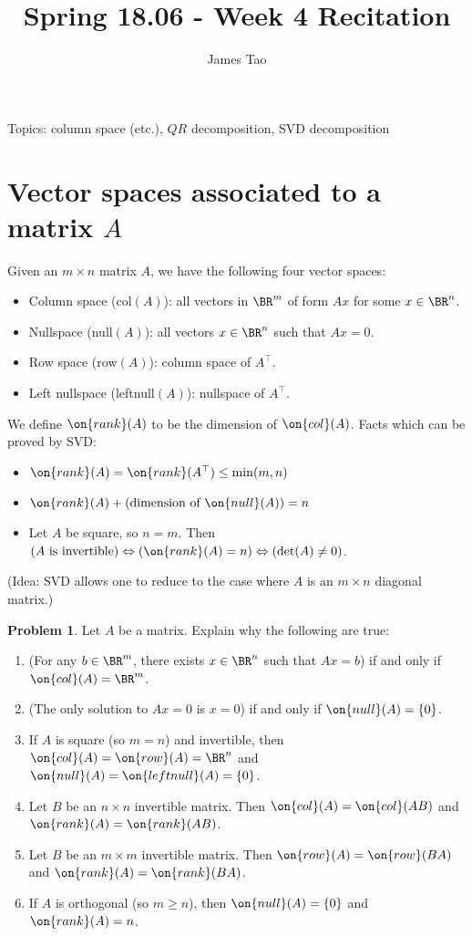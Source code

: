 \documentclass[10pt]{amsart}
\title{Spring 18.06 - Week 4 Recitation}
\author{James Tao}
\theoremstyle{mythm}
\theoremstyle{definition}
\newtheorem{prob}[thm]{Problem}
\theoremstyle{myrmk}
\begin{document}
	\thispagestyle{fancy}
	\noindent Topics: column space (etc.), $QR$ decomposition, SVD decomposition
	
	\section{Vector spaces associated to a matrix $A$} 
	
	Given an $m \times n$ matrix $A$, we have the following four vector spaces: 
	\begin{itemize}
		\item Column space (col$(A)$): all vectors in $\BR^m$ of form $Ax$ for some $x \in \BR^n$. 
		\item Nullspace (null$(A)$): all vectors $x \in \BR^n$ such that $Ax = 0$. 
		\item Row space (row$(A)$): column space of $A^\top$. 
		\item Left nullspace (leftnull$(A)$): nullspace of $A^\top$. 
	\end{itemize}
	We define $\on{rank}(A)$ to be the dimension of $\on{col}(A)$. Facts which can be proved by SVD: 
	\begin{itemize}
		\item $\on{rank}(A) = \on{rank}(A^\top) \le \min(m, n)$
		\item $\on{rank}(A) + (\text{dimension of } \on{null}(A)) = n$
		\item Let $A$ be square, so $n = m$. Then $(A \text{ is invertible}) \Leftrightarrow (\on{rank}(A) = n) \Leftrightarrow (\det(A) \neq 0)$. 
	\end{itemize}
	(Idea: SVD allows one to reduce to the case where $A$ is an $m \times n$ diagonal matrix.) 
	
	\begin{prob}
		Let $A$ be a matrix. Explain why the following are true: 
		\begin{enumerate}
			\item (For any $b \in \BR^m$, there exists $x \in \BR^n$ such that $Ax= b$) if and only if $\on{col}(A) = \BR^m$. 
			\item (The only solution to $Ax = 0$ is $x = 0$) if and only if $\on{null}(A) = \{0\}$. 
			\item If $A$ is square (so $m=n$) and invertible, then $\on{col}(A) = \on{row}(A) = \BR^n$ and $\on{null}(A) = \on{leftnull}(A) = \{0\}$. 
			\item Let $B$ be an $n \times n$ invertible matrix. Then $\on{col}(A) = \on{col}(AB)$ and $\on{rank}(A) =\on{rank}(AB)$. 
			\item Let $B$ be an $m \times m$ invertible matrix. Then $\on{row}(A) = \on{row}(BA)$ and $\on{rank}(A) = \on{rank}(BA)$. 
			\item If $A$ is orthogonal (so $m \ge n$), then $\on{null}(A) = \{0\}$ and $\on{rank}(A) = n$. 
		\end{enumerate}
	\end{prob}
	
\end{document}
